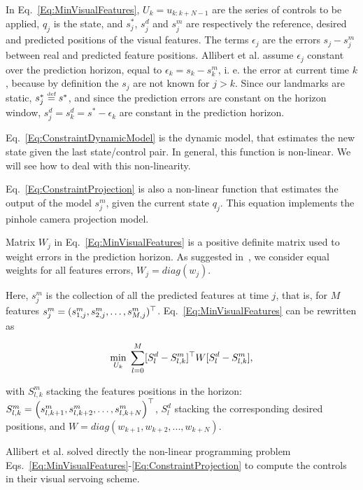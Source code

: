 In Eq.~\ref{Eq:MinVisualFeatures}, $U_{k}=u_{k:k+N-1}$ are the series of controls to be applied, $q_j$ is the state, and $s^*_j$, $s^d_j$ and $s^m_j$ are respectively the reference, desired and predicted positions of the visual features. The terms $\epsilon_j$ are the errors $s_j-s^m_j$ between real and predicted feature positions.
Allibert et al. assume $\epsilon_j$ constant over the prediction horizon, equal to $\epsilon_k=s_k-s^m_k$, i. e. the error at current time $k$, because by definition the $s_j$ are not known for $j>k$.
Since our landmarks are static, $s^*_j \stackrel{\mbox{\tiny def}}{=} s^*$, and since the prediction errors are constant on the horizon window, $s^d_j=s^d_k=s^*-\epsilon_k$ are constant in the prediction horizon.

Eq.~\ref{Eq:ConstraintDynamicModel} is the dynamic model, that estimates the new state given the last state/control pair. In general, this function is non-linear. We will see how to deal with this non-linearity.

Eq.~\ref{Eq:ConstraintProjection} is also a non-linear function that estimates the output of the model $s^m_j$, given the current state $q_j$. This equation implements the pinhole camera projection model.

Matrix $W_j$ in Eq.~\ref{Eq:MinVisualFeatures} is a positive definite matrix  used to weight errors in the prediction horizon. As suggested in~\cite{Allibert2010}, we   consider equal weights for all features errors, $W_j = diag(w_j)$. 

Here, $s^m_j$ is the collection of all the predicted features at time $j$, that is, for $M$ features $s^m_j = ( s_{1,j}^m, s_{2,j}^m, \hdots, s_{M,j}^m )^{\top} $. Eq.~\ref{Eq:MinVisualFeatures} can be rewritten as

\begin{equation}
\label{Eq:MinVisualFeatures2}
 \min_{U_{k}} \; \sum\limits_{l=0}^{M}  [S^d_{l} - S^m_{l,k}]^{\top} W [S^d_{l} - S^m_{l,k}],
\end{equation}

with $S^m_{l,k}$ stacking the features positions in the horizon: $S^m_{l,k} =  \left(
  s^m_{l,k+1},
  s^m_{l,k+2},
 \dots,
  s^m_{l,k+N}
 \right)^{\top}$, $S^d_{l}$ stacking the corresponding desired positions, and $W = diag(w_{k+1},w_{k+2},...,w_{k+N})$.

Allibert et al. solved directly the non-linear programming problem Eqs.~\ref{Eq:MinVisualFeatures}-\ref{Eq:ConstraintProjection} to compute the controls in their visual servoing scheme.

